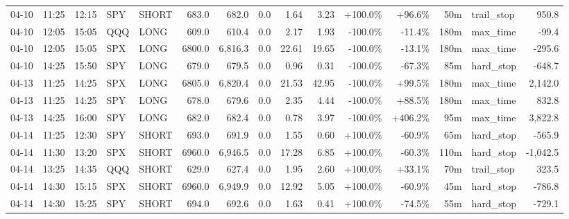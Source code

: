 \documentclass[11pt,a4paper,twoside]{article}
\begin{document}
\begin{landscape}
\begin{center}
\begin{longtable}{>{\color{txtmain}}l l l l l r r r r r r r r >{\color{txtmain}}l r}
04-10 & 11:25 & 12:15 & SPY & SHORT & 683.0 & 682.0 & 0.0 & 1.64 & 3.23 & \textcolor{wingreen}{+100.0\%} & \textcolor{wingreen}{+96.6\%} & 50m & trail\_stop & \textcolor{wingreen}{950.8} \\
04-10 & 12:05 & 15:05 & QQQ & LONG & 609.0 & 610.4 & 0.0 & 2.17 & 1.93 & \textcolor{lossred}{-100.0\%} & \textcolor{lossred}{-11.4\%} & 180m & max\_time & \textcolor{lossred}{-99.4} \\
04-10 & 12:05 & 15:05 & SPX & LONG & 6800.0 & 6,816.3 & 0.0 & 22.61 & 19.65 & \textcolor{lossred}{-100.0\%} & \textcolor{lossred}{-13.1\%} & 180m & max\_time & \textcolor{lossred}{-295.6} \\
04-10 & 14:25 & 15:50 & SPY & LONG & 679.0 & 679.5 & 0.0 & 0.96 & 0.31 & \textcolor{lossred}{-100.0\%} & \textcolor{lossred}{-67.3\%} & 85m & hard\_stop & \textcolor{lossred}{-648.7} \\
04-13 & 11:25 & 14:25 & SPX & LONG & 6805.0 & 6,820.4 & 0.0 & 21.53 & 42.95 & \textcolor{lossred}{-100.0\%} & \textcolor{wingreen}{+99.5\%} & 180m & max\_time & \textcolor{wingreen}{2,142.0} \\
04-13 & 11:25 & 14:25 & SPY & LONG & 678.0 & 679.6 & 0.0 & 2.35 & 4.44 & \textcolor{lossred}{-100.0\%} & \textcolor{wingreen}{+88.5\%} & 180m & max\_time & \textcolor{wingreen}{832.8} \\
04-13 & 14:25 & 16:00 & SPY & LONG & 682.0 & 682.4 & 0.0 & 0.78 & 3.97 & \textcolor{lossred}{-100.0\%} & \textcolor{wingreen}{+406.2\%} & 95m & max\_time & \textcolor{wingreen}{3,822.8} \\
04-14 & 11:25 & 12:30 & SPY & SHORT & 693.0 & 691.9 & 0.0 & 1.55 & 0.60 & \textcolor{wingreen}{+100.0\%} & \textcolor{lossred}{-60.9\%} & 65m & hard\_stop & \textcolor{lossred}{-565.9} \\
04-14 & 11:30 & 13:20 & SPX & SHORT & 6960.0 & 6,946.5 & 0.0 & 17.28 & 6.85 & \textcolor{wingreen}{+100.0\%} & \textcolor{lossred}{-60.3\%} & 110m & hard\_stop & \textcolor{lossred}{-1,042.5} \\
04-14 & 13:25 & 14:35 & QQQ & SHORT & 629.0 & 627.4 & 0.0 & 1.95 & 2.60 & \textcolor{wingreen}{+100.0\%} & \textcolor{wingreen}{+33.1\%} & 70m & trail\_stop & \textcolor{wingreen}{323.5} \\
04-14 & 14:30 & 15:15 & SPX & SHORT & 6960.0 & 6,949.9 & 0.0 & 12.92 & 5.05 & \textcolor{wingreen}{+100.0\%} & \textcolor{lossred}{-60.9\%} & 45m & hard\_stop & \textcolor{lossred}{-786.8} \\
04-14 & 14:30 & 15:25 & SPY & SHORT & 694.0 & 692.6 & 0.0 & 1.63 & 0.41 & \textcolor{wingreen}{+100.0\%} & \textcolor{lossred}{-74.5\%} & 55m & hard\_stop & \textcolor{lossred}{-729.1} \\

\end{longtable}
\end{center}
\end{landscape}
\end{document}

